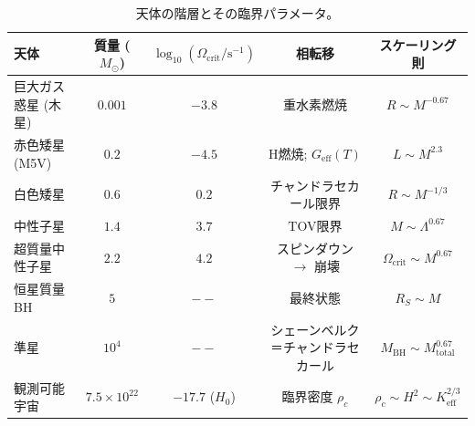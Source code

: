 \documentclass[11pt,a4paper]{article}
\begin{document}
	\begin{table}[htbp]
		\centering
		\caption{天体の階層とその臨界パラメータ。}
		\label{tab:hierarchy}
		\small
		\begin{tabular}{l c c c c}
			\toprule
			\textbf{天体} & \textbf{質量 (\(M_\odot\))} & \(\log_{10}(\Omega_{\mathrm{crit}}/\mathrm{s^{-1}})\) & \textbf{相転移} & \textbf{スケーリング則} \\
			\midrule
			巨大ガス惑星 (木星) & \(0.001\) & \(-3.8\) & 重水素燃焼 & \(R\sim M^{-0.67}\) \\
			赤色矮星 (M5V) & \(0.2\) & \(-4.5\) & H燃焼; \(G_{\mathrm{eff}}(T)\) & \(L\sim M^{2.3}\) \\
			白色矮星 & \(0.6\) & \(0.2\) & チャンドラセカール限界 & \(R\sim M^{-1/3}\) \\
			中性子星 & \(1.4\) & \(3.7\) & TOV限界 & \(M\sim\Lambda^{0.67}\) \\
			超質量中性子星 & \(2.2\) & \(4.2\) & スピンダウン \(\to\) 崩壊 & \(\Omega_{\mathrm{crit}}\sim M^{0.67}\) \\
			恒星質量 BH & \(5\) & \(--\) & 最終状態 & \(R_S\sim M\) \\
			準星 & \(10^4\) & \(--\) & シェーンベルク＝チャンドラセカール & \(M_{\mathrm{BH}}\sim M_{\mathrm{total}}^{0.67}\) \\
			観測可能宇宙 & \(7.5\times10^{22}\) & \(-17.7\) (\(H_0\)) & 臨界密度 \(\rho_c\) & \(\rho_c\sim H^2\sim K_{\mathrm{eff}}^{2/3}\) \\
			\bottomrule
		\end{tabular}
	\end{table}
	
\end{document}
